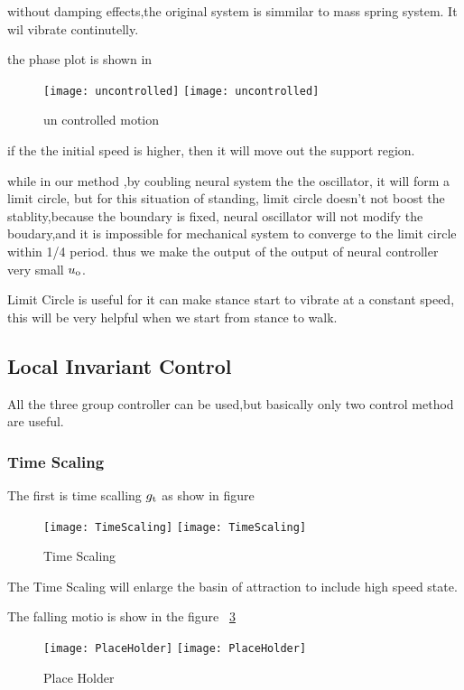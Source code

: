 without damping effects,the original system is simmilar to mass spring system.
It wil vibrate continutelly.

the phase plot is shown in
\begin{figure}[!htbp]
  \begin{center}
    \leavevmode
    \ifpdf
      \texttt{[image: uncontrolled]}
    \else
      \texttt{[image: uncontrolled]}
    \fi
    \caption{un controlled motion}
    \label{fig:stancepostures}
\end{center}
\end{figure}

if the the initial speed is higher, then it will move out the support region.



while in our method ,by coubling neural system the the oscillator, it will form a limit circle,
but for this situation of standing, limit circle doesn't not boost the stablity,because the boundary is fixed,
neural oscillator will not modify the boudary,and it is impossible for mechanical system to converge to the limit circle within 1/4 period.
thus we make the output of the output of neural controller very small $u_{\mathrm{o}}$.

Limit Circle is useful for it can make stance start to vibrate at a constant speed, this will be very helpful when we start from stance to walk.

\subsection{Local Invariant Control}
All the three group controller can be used,but basically only two control method are useful.
\subsubsection*{Time Scaling}
The first is time scalling $g_{\mathrm{t}}$
as show in figure
\begin{figure}[!htbp]
  \begin{center}
    \leavevmode
    \ifpdf
      \texttt{[image: TimeScaling]}
    \else
      \texttt{[image: TimeScaling]}
    \fi
    \caption{Time Scaling}
    \label{fig:stanceTimeScaling}
\end{center}
\end{figure}
The Time Scaling will enlarge the basin of attraction to include high speed state.

The falling motio is show in the figure ~\ref{fig:stancefall}
\begin{figure}[!htbp]
  \begin{center}
    \leavevmode
    \ifpdf
      \texttt{[image: PlaceHolder]}
    \else
      \texttt{[image: PlaceHolder]}
    \fi
    \caption{Place Holder}
    \label{fig:stancefall}
\end{center}
\end{figure}

